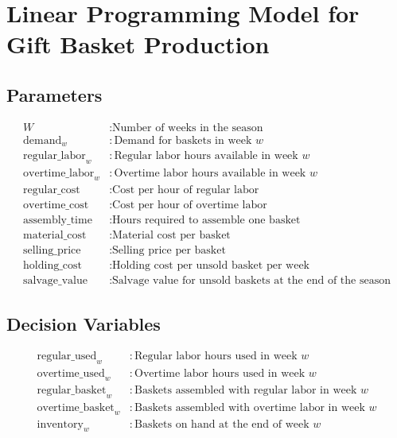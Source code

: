 \documentclass{article}
\begin{document}
\section*{Linear Programming Model for Gift Basket Production}

\subsection*{Parameters}
\begin{align*}
    W & : \text{Number of weeks in the season} \\
    \text{demand}_w & : \text{Demand for baskets in week } w \\
    \text{regular\_labor}_w & : \text{Regular labor hours available in week } w \\
    \text{overtime\_labor}_w & : \text{Overtime labor hours available in week } w \\
    \text{regular\_cost} & : \text{Cost per hour of regular labor} \\
    \text{overtime\_cost} & : \text{Cost per hour of overtime labor} \\
    \text{assembly\_time} & : \text{Hours required to assemble one basket} \\
    \text{material\_cost} & : \text{Material cost per basket} \\
    \text{selling\_price} & : \text{Selling price per basket} \\
    \text{holding\_cost} & : \text{Holding cost per unsold basket per week} \\
    \text{salvage\_value} & : \text{Salvage value for unsold baskets at the end of the season}
\end{align*}

\subsection*{Decision Variables}
\begin{align*}
    \text{regular\_used}_w & : \text{Regular labor hours used in week } w \\
    \text{overtime\_used}_w & : \text{Overtime labor hours used in week } w \\
    \text{regular\_basket}_w & : \text{Baskets assembled with regular labor in week } w \\
    \text{overtime\_basket}_w & : \text{Baskets assembled with overtime labor in week } w \\
    \text{inventory}_w & : \text{Baskets on hand at the end of week } w
\end{align*}
\end{document}
